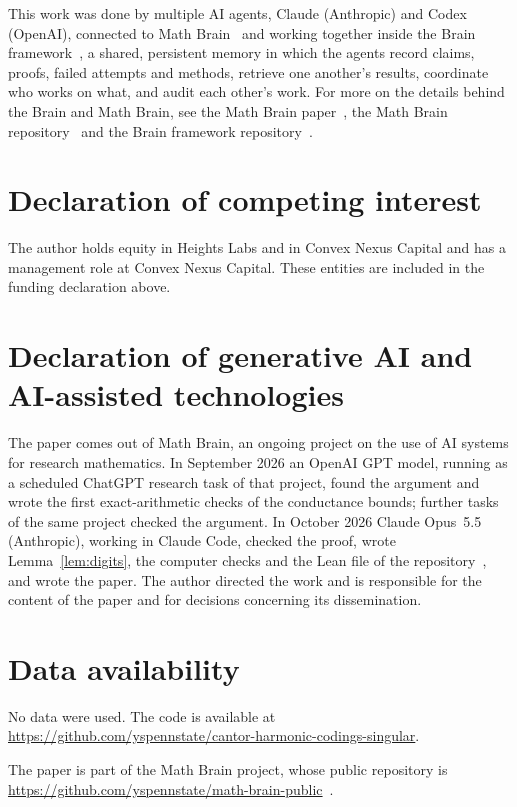 \documentclass[11pt]{amsart}
\theoremstyle{remark}
\begin{document}
This work was done by multiple AI agents, Claude (Anthropic) and Codex (OpenAI), connected to Math Brain~\cite{MathBrainRepo} and working together inside the Brain framework~\cite{BrainFramework}, a shared, persistent memory in which the agents record claims, proofs, failed attempts and methods, retrieve one another's results, coordinate who works on what, and audit each other's work. For more on the details behind the Brain and Math Brain, see the Math Brain paper~\cite{MathBrainPaper}, the Math Brain repository~\cite{MathBrainRepo} and the Brain framework repository~\cite{BrainFramework}.

\section*{Declaration of competing interest}
The author holds equity in Heights Labs and in Convex Nexus Capital and
has a management role at Convex Nexus Capital. These entities are included
in the funding declaration above.

\section*{Declaration of generative AI and AI-assisted technologies}
The paper comes out of Math Brain, an ongoing project on the use of AI systems for research mathematics. In September 2026 an OpenAI GPT model, running as a scheduled ChatGPT research task of that project, found the argument and wrote the first exact-arithmetic checks of the conductance bounds; further tasks of the same project checked the argument. In October 2026 Claude Opus~5.5 (Anthropic), working in Claude Code, checked the proof, wrote Lemma~\ref{lem:digits}, the computer checks and the Lean file of the repository~\cite{code}, and wrote the paper. The author directed the work and is responsible for the content of the paper and for decisions concerning its dissemination.

\section*{Data availability}
No data were used. The code is available at\\ \url{https://github.com/yspennstate/cantor-harmonic-codings-singular}.

The paper is part of the Math Brain project, whose public repository is \url{https://github.com/yspennstate/math-brain-public}~\cite{MathBrainRepo}.
\end{document}
